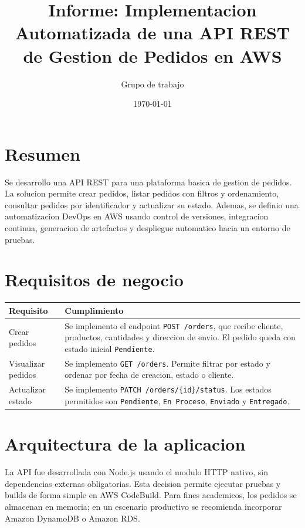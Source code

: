 \documentclass[12pt]{article}
\title{Informe: Implementacion Automatizada de una API REST de Gestion de Pedidos en AWS}
\author{Grupo de trabajo}
\date{\today}
\begin{document}
\maketitle

\section{Resumen}

Se desarrollo una API REST para una plataforma basica de gestion de pedidos. La solucion permite crear pedidos, listar pedidos con filtros y ordenamiento, consultar pedidos por identificador y actualizar su estado. Ademas, se definio una automatizacion DevOps en AWS usando control de versiones, integracion continua, generacion de artefactos y despliegue automatico hacia un entorno de pruebas.

\section{Requisitos de negocio}

\begin{longtable}{|p{5cm}|p{9cm}|}
\hline
\textbf{Requisito} & \textbf{Cumplimiento} \\
\hline
Crear pedidos & Se implemento el endpoint \texttt{POST /orders}, que recibe cliente, productos, cantidades y direccion de envio. El pedido queda con estado inicial \texttt{Pendiente}. \\
\hline
Visualizar pedidos & Se implemento \texttt{GET /orders}. Permite filtrar por estado y ordenar por fecha de creacion, estado o cliente. \\
\hline
Actualizar estado & Se implemento \texttt{PATCH /orders/\{id\}/status}. Los estados permitidos son \texttt{Pendiente}, \texttt{En Proceso}, \texttt{Enviado} y \texttt{Entregado}. \\
\hline
\end{longtable}

\section{Arquitectura de la aplicacion}

La API fue desarrollada con Node.js usando el modulo HTTP nativo, sin dependencias externas obligatorias. Esta decision permite ejecutar pruebas y builds de forma simple en AWS CodeBuild. Para fines academicos, los pedidos se almacenan en memoria; en un escenario productivo se recomienda incorporar Amazon DynamoDB o Amazon RDS.
\end{document}
